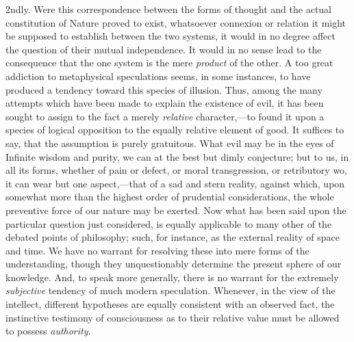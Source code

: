 \documentclass[oneside]{book}
\begin{document}
2ndly. Were this correspondence between the forms of thought
and the actual constitution of Nature proved to exist, whatsoever connexion or relation it might be supposed to establish between the two systems, it would in no degree affect the question
of their mutual independence. It would in no sense lead to the
consequence that the one system is the mere \emph{product} of the other.
A too great addiction to metaphysical speculations seems, in
some instances, to have produced a tendency toward this species
of illusion. Thus, among the many attempts which have been
made to explain the existence of evil, it has been sought to assign
to the fact a merely \emph{relative} character,---to found it upon a species
of logical opposition to the equally relative element of good. It
suffices to say, that the assumption is purely gratuitous. What
evil may be in the eyes of Infinite wisdom and purity, we can at
the best but dimly conjecture; but to us, in all its forms, whether of pain or defect, or moral transgression, or retributory wo,
it can wear but one aspect,---that of a sad and stern reality,
against which, upon somewhat more than the highest order of
prudential considerations, the whole preventive force of our
nature may be exerted. Now what has been said upon the
particular question just considered, is equally applicable to many
other of the debated points of philosophy; such, for instance,
as the external reality of space and time. We have no warrant for resolving these into mere forms of the understanding,
though they unquestionably determine the present sphere of
our knowledge. And, to speak more generally, there is no warrant for the extremely \emph{subjective} tendency of much modern speculation. Whenever, in the view of the intellect, different
hypotheses are equally consistent with an observed fact, the
instinctive testimony of consciousness as to their relative value
must be allowed to possess \emph{authority}.
\end{document}
